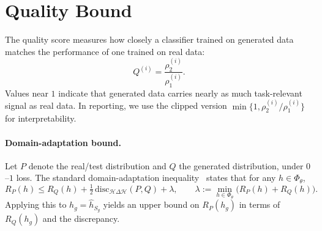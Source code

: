 \section{Quality Bound}
\label{app:theory-quality}
\label{appendix:quality-bound}

The quality score measures how closely a classifier trained on generated data matches the performance of one trained on real data:
\begin{equation}
Q^{(i)} = \frac{\rho_2^{(i)}}{\rho_1^{(i)}}.
\end{equation}
Values near $1$ indicate that generated data carries nearly as much task-relevant signal as real data. In reporting, we use the clipped version $\min\{1,\rho_2^{(i)}/\rho_1^{(i)}\}$ for interpretability.

\paragraph{Domain-adaptation bound.}
Let $P$ denote the real/test distribution and $Q$ the generated distribution, under $0$--$1$ loss. The standard domain-adaptation inequality~\citep{ben2010theory,blitzer2007biographies} states that for any $h\in\Phi_\theta$,
\begin{equation}
R_P(h)\le R_Q(h)+\tfrac12\,\mathrm{disc}_{\mathcal H\Delta\mathcal H}(P,Q)+\lambda,
\qquad
\lambda:=\min_{h\in\Phi_\theta}\bigl(R_P(h)+R_Q(h)\bigr).
\end{equation}
Applying this to $h_g=\hat h_{S_g}$ yields an upper bound on $R_P(h_g)$ in terms of $R_Q(h_g)$ and the discrepancy.

